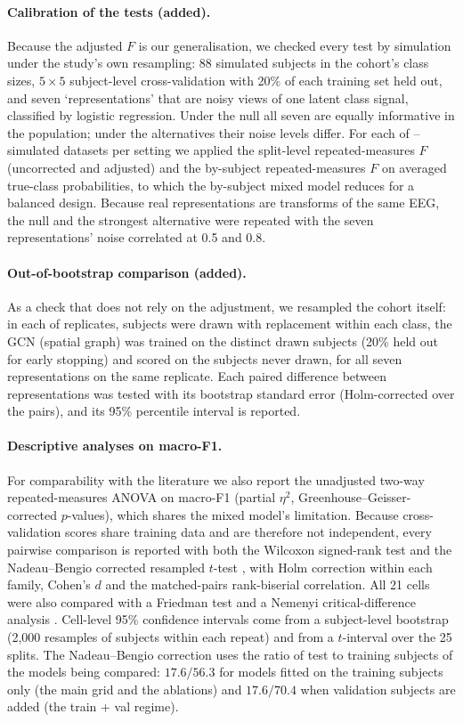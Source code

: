 \paragraph{Calibration of the tests (added).} Because the adjusted $F$ is our generalisation, we checked
every test by simulation under the study's own resampling: 88 simulated subjects in the cohort's class
sizes, $5\times5$ subject-level cross-validation with 20\% of each training set held out, and seven
`representations' that are noisy views of one latent class signal, classified by logistic regression.
Under the null all seven are equally informative in the population; under the alternatives their noise
levels differ. For each of \simNSimSubj--\simNSim{} simulated datasets per setting we applied the split-level
repeated-measures $F$ (uncorrected and adjusted) and the by-subject repeated-measures $F$ on averaged
true-class probabilities, to which the by-subject mixed model reduces for a balanced design. Because real
representations are transforms of the same EEG, the null and the strongest alternative were repeated with the
seven representations' noise correlated at 0.5 and 0.8.

\paragraph{Out-of-bootstrap comparison (added).} As a check that does not rely on the adjustment, we
resampled the cohort itself: in each of \bootN{} replicates, subjects were drawn with replacement within
each class, the GCN (spatial graph) was trained on the distinct drawn subjects (20\% held out for early
stopping) and scored on the subjects never drawn, for all seven representations on the same replicate.
Each paired difference between representations was tested with its bootstrap standard error (Holm-corrected
over the \bootNPairs{} pairs), and its 95\% percentile interval is reported.

\paragraph{Descriptive analyses on macro-F1.} For comparability with the literature we also report the
unadjusted two-way repeated-measures ANOVA on macro-F1 (partial $\eta^2$, Greenhouse--Geisser-corrected
$p$-values), which shares the mixed model's limitation. Because
cross-validation scores share training data and are therefore not independent, every pairwise
comparison is reported with both the Wilcoxon signed-rank test and the Nadeau--Bengio corrected
resampled $t$-test \cite{B7}, with Holm correction \cite{holm} within
each family, Cohen's $d$ and the matched-pairs rank-biserial correlation. All 21 cells were also
compared with a Friedman test and a Nemenyi critical-difference analysis \cite{demsar}. Cell-level
95\% confidence intervals come from a subject-level bootstrap (2,000 resamples of subjects within each
repeat) and from a $t$-interval over the 25 splits. The Nadeau--Bengio correction uses the ratio of
test to training subjects of the models being compared: $17.6/56.3$ for models fitted on the training
subjects only (the main grid and the ablations) and $17.6/70.4$ when validation subjects are added
(the train + val regime).

